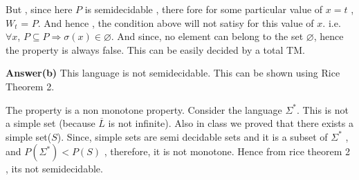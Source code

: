 \documentclass[addpoints,12pt]{exam}
\begin{document}
\begin{questions}
But , since here $P$ is semidecidable , there fore for some particular value of $x=t$ , $W_{t}$ = $P$. And hence , the condition above will not satisy for this
value of $x$. i.e. \newline
$\forall x$, $P \subseteq P  \Longrightarrow \sigma (x) \in \varnothing$. \newline
And since, no element can belong to the set $\varnothing$, hence the property is always false. This can be easily decided by a total TM.


\textbf{Answer(b)}\newline
This language is not semidecidable. This can be shown using Rice Theorem 2.\newline

The property is a non monotone property.\newline
Consider the language $\Sigma^{\ast}$. This is not a simple set (because $\overline{L}$ is not infinite).
Also in class we proved that there exists a simple set($S$). Since, simple sets are semi decidable sets and it is a subset of $\Sigma^{\ast}$ , and $P(\Sigma^{\ast}) < P(S)$ , therefore, 
it is not monotone. Hence from rice theorem 2 , its not semidecidable.


\end{questions}
\end{document}
